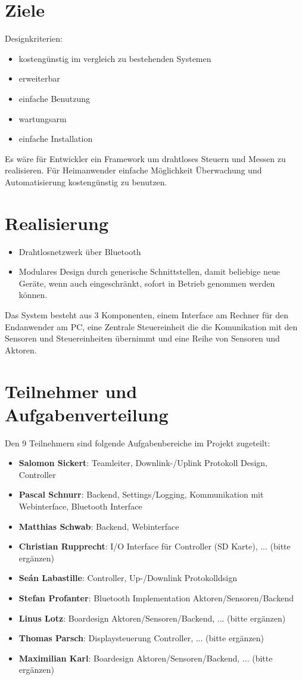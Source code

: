 \documentclass[12pt,a4paper]{article}
\begin{document}
\section{Ziele}
Designkriterien:
\begin{itemize}
	\item kostengünstig im vergleich zu bestehenden Systemen
	\item erweiterbar
	\item einfache Benutzung
	\item wartungsarm
	\item einfache Installation
\end{itemize}
Es wäre für Entwickler ein Framework um drahtloses Steuern und Messen zu realisieren. Für Heimanwender einfache Möglichkeit Überwachung und Automatisierung kostengünstig zu benutzen. 

\section{Realisierung}
\begin{itemize}
	\item Drahtlosnetzwerk über Bluetooth
	\item Modulares Design durch generische Schnittstellen, damit beliebige neue Geräte, wenn auch eingeschränkt, sofort in Betrieb genommen werden können.
\end{itemize}
Das System besteht aus 3 Komponenten, einem Interface am Rechner für den Endanwender am PC, eine Zentrale Steuereinheit die die Komunikation mit den Sensoren und Steuereinheiten übernimmt und eine Reihe von Sensoren und Aktoren.

\section{Teilnehmer und Aufgabenverteilung}

Den 9 Teilnehmern sind folgende Aufgabenbereiche im Projekt zugeteilt:\\

\begin{itemize}
	\item {\bf Salomon Sickert}: Teamleiter, Downlink-/Uplink Protokoll Design, Controller
	\item {\bf Pascal Schnurr}: Backend, Settings/Logging, Kommunikation mit Webinterface, Bluetooth Interface
	\item {\bf Matthias Schwab}: Backend, Webinterface
	\item {\bf Christian Rupprecht}: I/O Interface für Controller (SD Karte), ... (bitte ergänzen)
	\item {\bf Seán Labastille}: Controller, Up-/Downlink Protokolldsign
	\item {\bf Stefan Profanter}: Bluetooth Implementation Aktoren/Sensoren/Backend
	\item {\bf Linus Lotz}: Boardesign Aktoren/Sensoren/Backend, ... (bitte ergänzen)
	\item {\bf Thomas Parsch}: Displaysteuerung Controller, ... (bitte ergänzen)
	\item {\bf Maximilian Karl}: Boardesign Aktoren/Sensoren/Backend, ... (bitte ergänzen)
\end{itemize}
\end{document}

